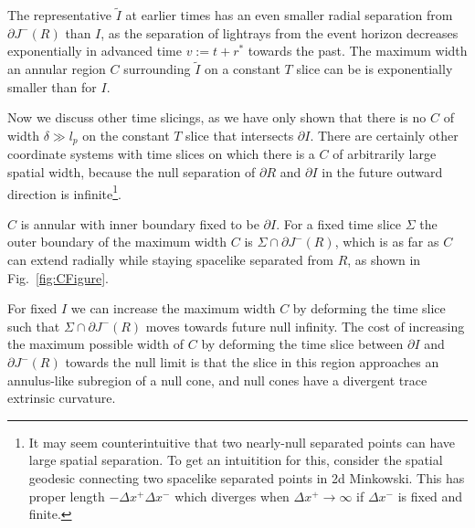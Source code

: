 \documentclass[a4paper,11pt]{article}
\newcommand{\cts}[1]{\ignorespaces}
\def\bne{\begin{equation}}
\def\ene{\end{equation}}
\newcommand{\del}{\partial}
\begin{document}
The representative $\tilde I$ at earlier times has an even smaller radial separation from $\del J^- (R)$ than $I$, as the separation of lightrays from the event horizon decreases exponentially in advanced time $v := t + r^*$ towards the past. The maximum width an annular region $C$ surrounding $\tilde I$ on a constant $T$ slice can be is exponentially smaller than for $I$.

Now we discuss other time slicings, as 
we have only shown that there is no $C$ of width $\delta \gg l_p$ on the constant $T$ slice that intersects $\del I$. There are certainly other coordinate systems with time slices on which there is a $C$ of arbitrarily large spatial width, because the null separation of $\del R$ and $\del I$ in the future outward direction is infinite\footnote{It may seem counterintuitive that two nearly-null separated points can have large spatial separation. To get an intuitition for this, consider the spatial geodesic connecting two spacelike separated points in 2d Minkowski. This has proper length $-\Delta x^+ \Delta x^-$ which diverges when $\Delta x^+ \to \infty$ if $\Delta x^-$ is fixed and finite.}. 

$C$ is annular with inner boundary fixed to be $\del I$. For a fixed time slice $\Sigma$ the outer boundary of the maximum width $C$ is $\Sigma \cap \del J^- (R)$, which is as far as $C$ can extend radially while staying spacelike separated from $R$, as shown in Fig.~\ref{fig:CFigure}. 

For fixed $I$ we can increase the maximum width $C$ by deforming the time slice such that $\Sigma \cap \del J^- (R)$ moves towards future null infinity. The cost of increasing the maximum possible width of $C$ by deforming the time slice between $\del I$ and $\del J^- (R)$ towards the null limit is that the slice in this region approaches an annulus-like subregion of a null cone, and null cones have a divergent trace extrinsic curvature.
\end{document}
